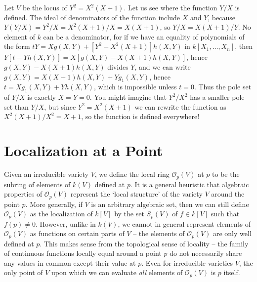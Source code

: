 \begin{example}
    Let $V$ be the locus of $Y^2 = X^2(X+1)$. Let us see where the function $Y/X$ is defined. The ideal of denominators of the function include $X$ and $Y$, because $Y(Y/X) = Y^2/X = X^2(X+1)/X = X(X+1)$, so $Y/X = X(X+1)/Y$. No element of $k$ can be a denominator, for if we have an equality of polynomials of the form $tY = Xg(X,Y) + [Y^2 - X^2(X+1)]h(X,Y)$ in $k[X_1, \dots, X_n]$, then $Y[t - Yh(X,Y)] = X[g(X,Y) - X(X+1)h(X,Y)]$, hence $g(X,Y) - X(X+1)h(X,Y)$ divides $Y$, and we can write $g(X,Y) = X(X+1)h(X,Y) + Yg_1(X,Y)$, hence $t = Xg_1(X,Y) + Yh(X,Y)$, which is impossible unless $t = 0$. Thus the pole set of $Y/X$ is exactly $X = Y = 0$. You might imagine that $Y^2/X^2$ has a smaller pole set than $Y/X$, but since $Y^2 = X^2(X+1)$ we can rewrite the function as $X^2(X+1)/X^2 = X+1$, so the function is defined everywhere!
\end{example}

\section{Localization at a Point}

Given an irreducible variety $V$, we define the local ring $\mathcal{O}_p(V)$ at $p$ to be the subring of elements of $k(V)$ defined at $p$. It is a general heuristic that algebraic properties of $\mathcal{O}_p(V)$ represent the `local structure' of the variety $V$ around the point $p$. More generally, if $V$ is an arbitrary algebraic set, then we can still define $\mathcal{O}_p(V)$ as the localization of $k[V]$ by the set $S_p(V)$ of $f \in k[V]$ such that $f(p) \neq 0$. However, unlike in $k(V)$, we cannot in general represent elements of $\mathcal{O}_p(V)$ as functions on certain parts of $V$ -- the elements of $\mathcal{O}_p(V)$ are only well defined at $p$. This makes sense from the topological sense of locality -- the family of continuous functions locally equal around a point $p$ do not necessarily share any values in common except their value at $p$. Even for irreducible varieties $V$, the only point of $V$ upon which we can evaluate \emph{all} elements of $\mathcal{O}_p(V)$ is $p$ itself.

